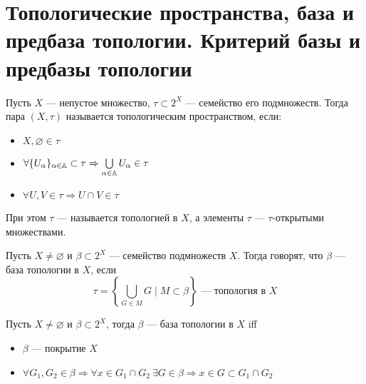 \newpage
\section{Топологические пространства, база и предбаза топологии. Критерий базы и предбазы топологии}

\begin{definition}
	Пусть $X$ --- непустое множество, $\tau \subset 2^X$ --- семейство его подмножеств. Тогда пара $(X, \tau)$ называется топологическим пространством, если:
	\begin{itemize}
		\item $X, \varnothing \in \tau$
		\item $\forall \{U_\alpha\}_{\alpha \in \mathbb{A}} \subset \tau \Rightarrow \bigcup\limits_{\alpha \in \mathbb{A}}U_\alpha \in \tau$
		\item $\forall U, V \in \tau \Rightarrow U \cap V \in \tau$
	\end{itemize}
При этом $\tau$ --- называется топологией в $X$, а элементы $\tau$ --- $\tau$-открытыми множествами.
\end{definition} 

\begin{definition}
	Пусть $X \neq \varnothing$ и $\beta \subset 2^X$ --- семейство подмножеств $X$. Тогда говорят, что $\beta$ --- база топологии в $X$, если 
	$$
	\tau = \left\{\bigcup\limits_{G \in M }G \mid M \subset \beta \right\} \text{ --- топология в } X
	$$
\end{definition}

\begin{theorem}\label{th:base_criterian}
	Пусть $X \neq \varnothing$ и $\beta \subset 2^X$, тогда $\beta$ --- база топологии в $X$ iff 
	\begin{itemize}
		\item $\beta$ --- покрытие $X$ 
		\item $\forall G_1, G_2 \in \beta \Rightarrow \forall x \in G_1 \cap G_2 \ \exists G \in \beta \Rightarrow x \in G \subset  G_1 \cap G_2$
	\end{itemize}
\end{theorem}

